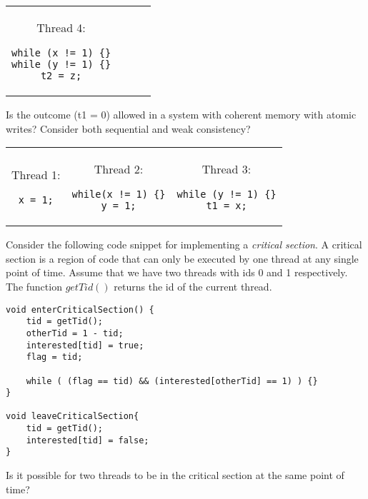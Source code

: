 \begin{ExerciseList}
\begin{tabular}{cccc}
\begin{minipage}{0.25\textwidth}
Thread 4:
\begin{Verbatim}
while (x != 1) {}
while (y != 1) {}
t2 = z;
\end{Verbatim}
\end{minipage}
\end{tabular}


\Exercise[difficulty=1]
Is the outcome (t1 = 0) allowed in a system with coherent memory with atomic writes? Consider both sequential and weak
consistency?

\begin{tabular}{ccc}

\begin{minipage}{0.3\textwidth}
Thread 1:
\begin{Verbatim}
x = 1;
\end{Verbatim}
\end{minipage}

&
\begin{minipage}{0.3\textwidth}
Thread 2:
\begin{Verbatim}
while(x != 1) {}
y = 1;
\end{Verbatim}
\end{minipage}
&

\begin{minipage}{0.3\textwidth}
Thread 3:
\begin{Verbatim}
while (y != 1) {}
t1 = x;
\end{Verbatim}
\end{minipage}
\end{tabular}


\Exercise[difficulty=1]
Consider the following code snippet for implementing a {\em critical section}. A critical section is a
region of code that can only be executed by one thread at any single point of time. Assume that
we have two threads with ids 0 and 1 respectively. The function $getTid()$ returns the id 
of the current thread. 

\begin{Verbatim}[frame=single]
void enterCriticalSection() {
	tid = getTid();
	otherTid = 1 - tid;
	interested[tid] = true;
	flag = tid;

	while ( (flag == tid) && (interested[otherTid] == 1) ) {}
}

void leaveCriticalSection{
	tid = getTid();
	interested[tid] = false;
}
\end{Verbatim}

Is it possible for two threads to be in the critical section at the same point of time? 


\end{ExerciseList}
